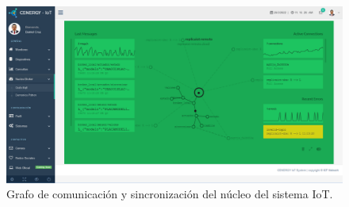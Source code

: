 \begin{landscape} %
\begin{figure}[htpb]
\centering 
\includegraphics[width=1.5\textwidth]{./Figures/gui/nucleo.png}
\caption{Grafo de comunicación y sincronización del núcleo del sistema IoT.}
\label{fig:grafo}
\end{figure}
\end{landscape} %
